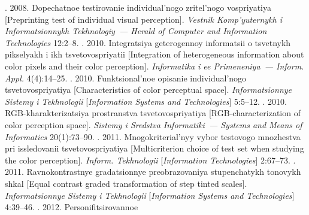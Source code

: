   
  


  \begin{multicols}{2}

\renewcommand{\bibname}{\protect\rmfamily References}

{\small\frenchspacing
{%
\begin{thebibliography}{99}

  . 2008. Dopechatnoe testirovanie 
individual'nogo zritel'nogo vospriyatiya [Preprinting test of individual visual 
perception]. \textit{Vestnik Komp'yuternykh i
Informatsionnykh Tekhnologiy~---
Herald of Computer and Information Technologies}  12:2--8.
  . 2010. Integratsiya geterogennoy
informatsii o tsvetnykh pikselyakh i ikh tsvetovospriyatii [Integration of heterogeneous 
information about color pixels and their color perception]. \textit{Informatika i ee Primeneniya~---
Inform. Appl.} 4(4):14--25.
  . 2010. Funktsional'noe opisanie 
individual'nogo tsvetovospriyatiya [Characteristics of color perceptual space]. 
\textit{Informatsionnye Sistemy i Tekhnologii} [\textit{Information Systems and 
Technologies}] 5:5--12.
  . 2010. RGB-kharakterizatsiya 
prostranstva tsvetovospriyatiya [RGB-characterization of color perception 
space]. \textit{Sistemy i Sredstva Informatiki~---
Systems and Means of Informatics} 20(1):73--90.
  . 2011. Mnogokriterial'nyy vybor 
testovogo mnozhestva pri issledovanii tsvetovospriyatiya [Multicriterion choice of 
test set when studying the color perception]. \textit{Inform. Tekhnologii} 
[\textit{Information Technologies}] 2:67--73.
  . 2011. Ravnokontrastnye gradatsionnye 
preobrazovaniya stupenchatykh tonovykh shkal [Equal contrast graded transformation 
of step tinted scales]. \textit{Informatsionnye Sistemy i Tekhnologii} 
[\textit{Information Systems and Technologies}] 4:39--46.
  . 2012. Personifitsirovannoe 

\end{thebibliography}}}
\end{multicols}
